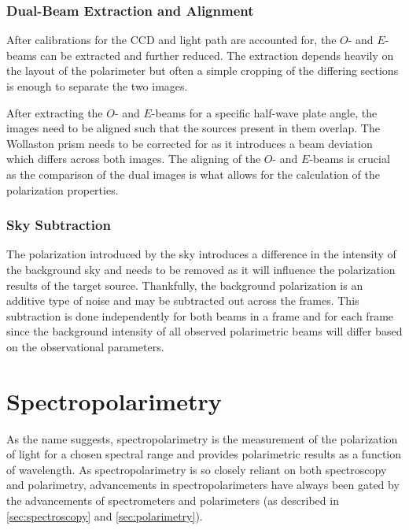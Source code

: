 \subsubsection{Dual-Beam Extraction and Alignment} \label{subsubsec:pol_oe_extract}

After calibrations for the \gls{CCD} and light path are accounted for, the $O$- and $E$-beams can be extracted and further reduced.
The extraction depends heavily on the layout of the polarimeter but often a simple cropping of the differing sections is enough to separate the two images.

After extracting the $O$- and $E$-beams for a specific half-wave plate angle, the images need to be aligned such that the sources present in them overlap.
The Wollaston prism needs to be corrected for as it introduces a beam deviation which differs across both images.
The aligning of the $O$- and $E$-beams is crucial as the comparison of the dual images is what allows for the calculation of the polarization properties.

\subsubsection{Sky Subtraction} \label{subsubsec:pol_sky_subtract}

The polarization introduced by the sky introduces a difference in the intensity of the background sky and needs to be removed as it will influence the polarization results of the target source.
Thankfully, the background polarization is an additive type of noise and may be subtracted out across the frames.
This subtraction is done independently for both beams in a frame and for each frame since the background intensity of all observed polarimetric beams will differ based on the observational parameters.

\section{Spectropolarimetry} \label{sec:spectropolarimetry} %

As the name suggests, spectropolarimetry is the measurement of the polarization of light for a chosen spectral range and provides polarimetric results as a function of wavelength.
As spectropolarimetry is so closely reliant on both spectroscopy and polarimetry, advancements in spectropolarimeters have always been gated by the advancements of spectrometers and polarimeters (as described in \autoref{sec:spectroscopy} and \autoref{sec:polarimetry}).

